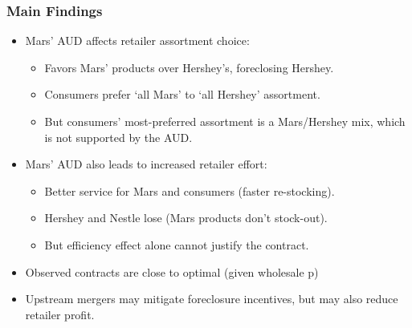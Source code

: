 \documentclass[aspectratio=169,11pt]{beamer}
\begin{document}
\begin{frame}\frametitle{Main Findings}
\begin{itemize}
\item Mars' AUD affects retailer assortment choice:
	\begin{itemize}
	\item Favors Mars' products over Hershey's, foreclosing Hershey.
	\item Consumers prefer `all Mars' to `all Hershey' assortment.
	\item But consumers' most-preferred assortment is a Mars/Hershey mix, which is not supported by the AUD.
	\end{itemize}
\item Mars' AUD also leads to increased retailer effort:
\begin{itemize}
\item Better service for Mars and consumers (faster re-stocking).
\item Hershey and Nestle lose (Mars products don't stock-out).
\item But efficiency effect alone cannot justify the contract.
\end{itemize}
\item Observed contracts are close to optimal (given wholesale p)
\item Upstream mergers may mitigate foreclosure incentives, but may also reduce retailer profit.
\end{itemize}
\end{frame}
\end{document}
